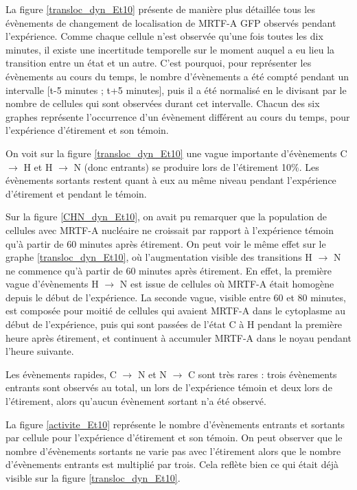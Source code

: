 La figure \ref{transloc_dyn_Et10} présente de manière plus détaillée tous les évènements de changement de localisation de MRTF-A GFP observés pendant l'expérience. 
Comme chaque cellule n'est observée qu'une fois toutes les dix minutes, il existe une incertitude temporelle sur le moment auquel a eu lieu la transition entre un état et un autre. C'est pourquoi, pour représenter les évènements au cours du temps, le nombre d'évènements a été compté pendant un intervalle [t-5 minutes ; t+5 minutes], puis il a été normalisé en le divisant par le nombre de cellules qui sont observées durant cet intervalle. 
Chacun des six graphes représente l'occurrence d'un évènement différent au cours du temps, pour l'expérience d'étirement et son témoin. 

On voit sur la figure \ref{transloc_dyn_Et10} une vague importante d'évènements C$\rightarrow$ H et H $\rightarrow$ N (donc entrants) se produire lors de l'étirement 10\%. Les évènements sortants restent quant à eux au même niveau pendant l'expérience d'étirement et pendant le témoin. 

Sur la figure \ref{CHN_dyn_Et10}, on avait pu remarquer que la population de cellules avec MRTF-A nucléaire ne croissait par rapport à l'expérience témoin qu'à partir de 60 minutes après étirement. On peut voir le même effet sur le graphe \ref{transloc_dyn_Et10}, où l'augmentation visible des transitions H $\rightarrow$ N ne commence qu'à partir de 60 minutes après étirement. 
En effet, la première vague d'évènements H $\rightarrow$ N est issue de cellules où MRTF-A était homogène depuis le début de l'expérience. La seconde vague, visible entre 60 et 80 minutes, est composée pour moitié de cellules qui avaient MRTF-A dans le cytoplasme au début de l'expérience, puis qui sont passées de l'état C à H pendant la première heure après étirement, et continuent à accumuler MRTF-A dans le noyau pendant l'heure suivante. 

Les évènements rapides, C $\rightarrow$ N et N $\rightarrow$ C sont très rares : trois évènements entrants sont observés au total, un lors de l'expérience témoin et deux lors de l'étirement, alors qu'aucun évènement sortant n'a été observé. 

La figure \ref{activite_Et10} représente le nombre d'évènements entrants et sortants par cellule pour l'expérience d'étirement et son témoin. 
On peut observer que le nombre d'évènements sortants ne varie pas avec l'étirement alors que le nombre d'évènements entrants est multiplié par trois. Cela reflète bien ce qui était déjà visible sur la figure \ref{transloc_dyn_Et10}. 

